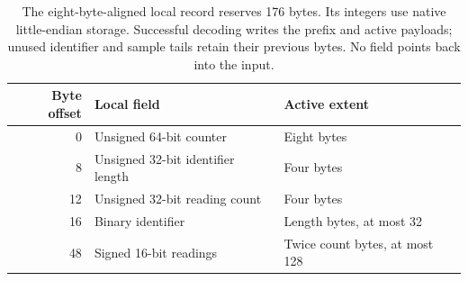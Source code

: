 \begin{table}[htbp]
  \centering
  \begin{tabular}{r l l}
    \toprule
    Byte offset & Local field                       & Active extent                  \\
    \midrule
    0           & Unsigned 64-bit counter           & Eight bytes                    \\
    8           & Unsigned 32-bit identifier length & Four bytes                     \\
    12          & Unsigned 32-bit reading count     & Four bytes                     \\
    16          & Binary identifier                 & Length bytes, at most 32       \\
    48          & Signed 16-bit readings            & Twice count bytes, at most 128 \\
    \bottomrule
  \end{tabular}
  \caption{The eight-byte-aligned local record reserves 176 bytes. Its integers use native little-endian storage. Successful decoding writes the prefix and active payloads; unused identifier and sample tails retain their previous bytes. No field points back into the input.}
  \label{tab:revision-cbor-record}
\end{table}
